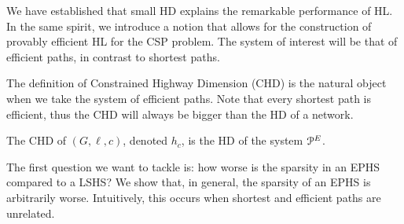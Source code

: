 
We have established that small HD explains the remarkable performance of HL.
In the same spirit, we introduce a notion that allows for the construction of provably efficient HL for the CSP problem.
The system of interest will be that of efficient paths, in contrast to shortest paths.


The definition of Constrained Highway Dimension (CHD) is the natural object when we take the system of efficient paths.
Note that every shortest path is efficient, thus the CHD will always be bigger than the HD of a network.

\begin{definition}
The CHD of $(G,\ell,c)$, denoted $h_c$, is the HD of the system $\mathcal{P}^E$.
\end{definition}

The first question we want to tackle is: how worse is the sparsity in an EPHS compared to a LSHS?
We show that, in general, the sparsity of an EPHS is arbitrarily worse.
Intuitively, this occurs when shortest and efficient paths are unrelated. 

